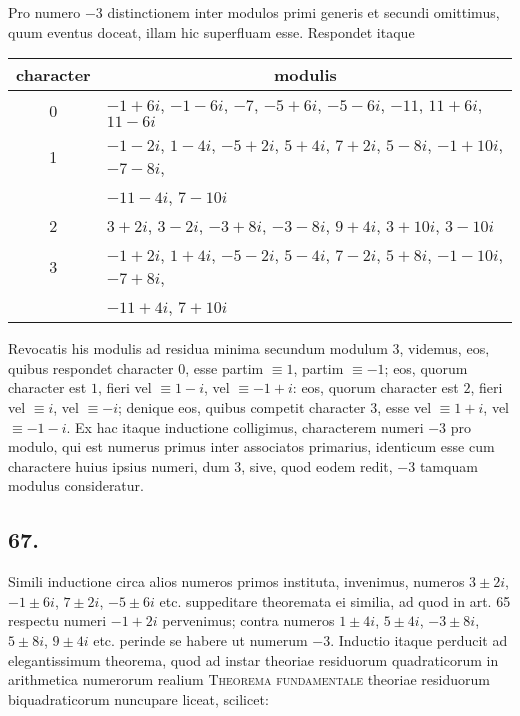 \documentclass[twoside,12pt]{memoir}
\begin{document}
Pro numero \(-3\) distinctionem inter modulos primi generis et secundi omittimus, quum eventus doceat, illam hic superfluam esse. Respondet itaque\pagebreak%
\begin{center}
\begin{tabular}{c|l}
character & \multicolumn{1}{c}{modulis} \\
\hline
0 & \(-1+6 i\), \(-1-6 i\), \(-7\), \(-5+6 i\), \(-5-6 i\), \(-11\), \(11+6 i\), \( 11-6 i\) \\
1 & \(-1-2 i\), \( 1-4 i\), \(-5+2 i\), \( 5+4 i\), \( 7+2 i\), \( 5-8 i\), \(-1+10 i\), \(-7-8 i\),  \\
 & \quad \(-11-4 i\), \( 7-10 i\) \\
2 & \(3+2 i\), \( 3-2 i\), \(-3+8 i\), \(-3-8 i\), \( 9+4 i\), \( 3+10 i\), \( 3-10 i\) \\
3 & \(-1+2 i\), \( 1+4 i\), \(-5-2 i\), \( 5-4 i\), \( 7-2 i\), \( 5+8 i\), \(-1-10 i\), \(-7+8 i\), \\
 & \quad \(-11+4 i\), \( 7+10 i\) \\
\end{tabular}
\end{center}
 
Revocatis his modulis ad residua minima secundum modulum \(3\), videmus, eos, quibus respondet character \(0\), esse partim \(\equiv 1\), partim \(\equiv-1\); eos, quorum character est \(1\), fieri vel \(\equiv 1-i\), vel \(\equiv-1+i\): eos, quorum character est \(2\), fieri vel \(\equiv i\), vel \(\equiv-i\); denique eos, quibus competit character \(3\), esse vel \(\equiv 1+i\), vel \(\equiv-1-i\). Ex hac itaque inductione colligimus, characterem numeri \(-3\) pro modulo, qui est numerus primus inter associatos primarius, identicum esse cum charactere huius ipsius numeri, dum \(3\), sive, quod eodem redit, \(-3\) tamquam modulus consideratur.

\subsection*{67.}
 
Simili inductione circa alios numeros primos instituta, invenimus, numeros \(3 \pm 2 i\), \(-1 \pm 6 i\), \( 7 \pm 2 i\), \(-5 \pm 6 i\) etc. suppeditare theoremata ei similia, ad quod in art. 65 respectu numeri \(-1+2 i\) pervenimus; contra numeros \(1 \pm 4 i\), \( 5 \pm 4 i\), \(-3 \pm 8 i\), \( 5 \pm 8 i\), \( 9 \pm 4 i\) etc. perinde se habere ut numerum \(-3\). Inductio itaque perducit ad elegantissimum theorema, quod ad instar theoriae residuorum quadraticorum in arithmetica numerorum realium \textsc{Theorema fundamentale} theoriae residuorum biquadraticorum nuncupare liceat, scilicet:
 
\end{document}

